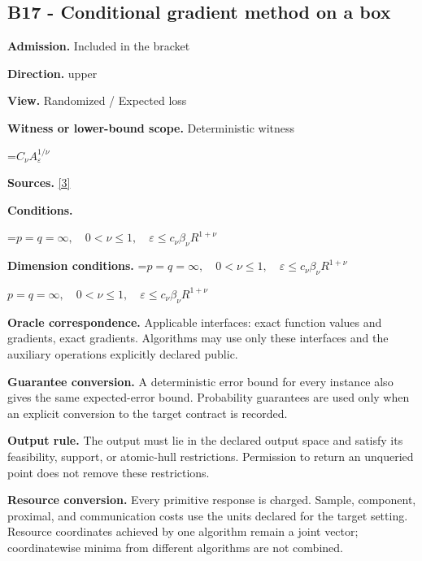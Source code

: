 \documentclass[10pt,a4paper]{article}
\newcommand{\AtlasMath}[1]{\par\begingroup\centering\setbox0=\hbox{$\displaystyle #1$}\ifdim\wd0>1.4\linewidth\typeout{ATLAS WIDE FORMULA: \the\wd0}\fi\ifdim\wd0>\linewidth\resizebox{\linewidth}{!}{\box0}\else\box0\fi\par\endgroup}
\newcommand{\AtlasInlineMath}[1]{\begingroup\setbox0=\hbox{$#1$}\ifdim\wd0>.4\linewidth\endgroup\AtlasMath{#1}\else\endgroup$#1$\fi}
\begin{document}
\subsection{B17 - Conditional gradient method on a box}


\textbf{Admission.} Included in the bracket



\textbf{Direction.} upper



\textbf{View.} Randomized / Expected loss



\textbf{Witness or lower-bound scope.} Deterministic witness



\AtlasMath{C_\nu A_\varepsilon^{1/\nu}}


\textbf{Sources.} \href{https://arxiv.org/pdf/1307.5001}{[3]}



\textbf{Conditions.}
\AtlasMath{p=q=\infty,\quad0<\nu\le1,\quad\varepsilon\le c_\nu\beta_\nu R^{1+\nu}}




\textbf{Dimension conditions.} \AtlasInlineMath{p=q=\infty,\quad0<\nu\le1,\quad\varepsilon\le c_\nu\beta_\nu R^{1+\nu}}



\textbf{Oracle correspondence.} Applicable interfaces: exact function values and gradients, exact gradients. Algorithms may use only these interfaces and the auxiliary operations explicitly declared public.



\textbf{Guarantee conversion.} A deterministic error bound for every instance also gives the same expected-error bound. Probability guarantees are used only when an explicit conversion to the target contract is recorded.



\textbf{Output rule.} The output must lie in the declared output space and satisfy its feasibility, support, or atomic-hull restrictions. Permission to return an unqueried point does not remove these restrictions.



\textbf{Resource conversion.} Every primitive response is charged. Sample, component, proximal, and communication costs use the units declared for the target setting. Resource coordinates achieved by one algorithm remain a joint vector; coordinatewise minima from different algorithms are not combined.
\end{document}
